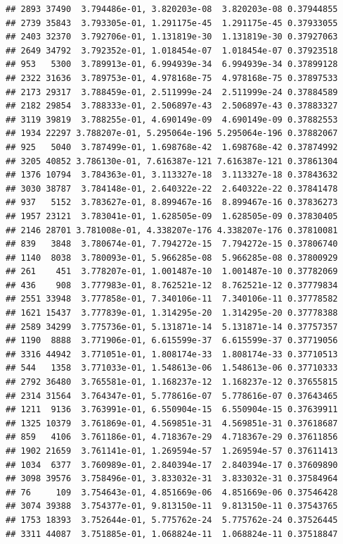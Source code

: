 \documentclass[
]{article}
\begin{document}
\begin{verbatim}
## 2893 37490  3.794486e-01, 3.820203e-08  3.820203e-08 0.37944855
## 2739 35843  3.793305e-01, 1.291175e-45  1.291175e-45 0.37933055
## 2403 32370  3.792706e-01, 1.131819e-30  1.131819e-30 0.37927063
## 2649 34792  3.792352e-01, 1.018454e-07  1.018454e-07 0.37923518
## 953   5300  3.789913e-01, 6.994939e-34  6.994939e-34 0.37899128
## 2322 31636  3.789753e-01, 4.978168e-75  4.978168e-75 0.37897533
## 2173 29317  3.788459e-01, 2.511999e-24  2.511999e-24 0.37884589
## 2182 29854  3.788333e-01, 2.506897e-43  2.506897e-43 0.37883327
## 3119 39819  3.788255e-01, 4.690149e-09  4.690149e-09 0.37882553
## 1934 22297 3.788207e-01, 5.295064e-196 5.295064e-196 0.37882067
## 925   5040  3.787499e-01, 1.698768e-42  1.698768e-42 0.37874992
## 3205 40852 3.786130e-01, 7.616387e-121 7.616387e-121 0.37861304
## 1376 10794  3.784363e-01, 3.113327e-18  3.113327e-18 0.37843632
## 3030 38787  3.784148e-01, 2.640322e-22  2.640322e-22 0.37841478
## 937   5152  3.783627e-01, 8.899467e-16  8.899467e-16 0.37836273
## 1957 23121  3.783041e-01, 1.628505e-09  1.628505e-09 0.37830405
## 2146 28701 3.781008e-01, 4.338207e-176 4.338207e-176 0.37810081
## 839   3848  3.780674e-01, 7.794272e-15  7.794272e-15 0.37806740
## 1140  8038  3.780093e-01, 5.966285e-08  5.966285e-08 0.37800929
## 261    451  3.778207e-01, 1.001487e-10  1.001487e-10 0.37782069
## 436    908  3.777983e-01, 8.762521e-12  8.762521e-12 0.37779834
## 2551 33948  3.777858e-01, 7.340106e-11  7.340106e-11 0.37778582
## 1621 15437  3.777839e-01, 1.314295e-20  1.314295e-20 0.37778388
## 2589 34299  3.775736e-01, 5.131871e-14  5.131871e-14 0.37757357
## 1190  8888  3.771906e-01, 6.615599e-37  6.615599e-37 0.37719056
## 3316 44942  3.771051e-01, 1.808174e-33  1.808174e-33 0.37710513
## 544   1358  3.771033e-01, 1.548613e-06  1.548613e-06 0.37710333
## 2792 36480  3.765581e-01, 1.168237e-12  1.168237e-12 0.37655815
## 2314 31564  3.764347e-01, 5.778616e-07  5.778616e-07 0.37643465
## 1211  9136  3.763991e-01, 6.550904e-15  6.550904e-15 0.37639911
## 1325 10379  3.761869e-01, 4.569851e-31  4.569851e-31 0.37618687
## 859   4106  3.761186e-01, 4.718367e-29  4.718367e-29 0.37611856
## 1902 21659  3.761141e-01, 1.269594e-57  1.269594e-57 0.37611413
## 1034  6377  3.760989e-01, 2.840394e-17  2.840394e-17 0.37609890
## 3098 39576  3.758496e-01, 3.833032e-31  3.833032e-31 0.37584964
## 76     109  3.754643e-01, 4.851669e-06  4.851669e-06 0.37546428
## 3074 39388  3.754377e-01, 9.813150e-11  9.813150e-11 0.37543765
## 1753 18393  3.752644e-01, 5.775762e-24  5.775762e-24 0.37526445
## 3311 44087  3.751885e-01, 1.068824e-11  1.068824e-11 0.37518847

\end{verbatim}
\end{document}
